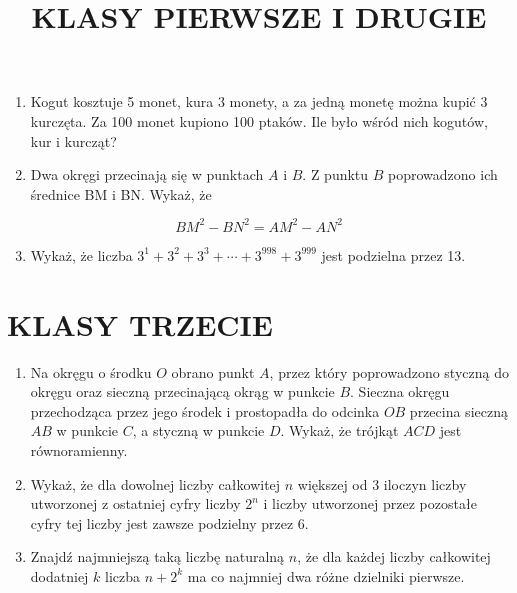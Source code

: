 \documentclass[10pt]{article}
\title{KLASY PIERWSZE I DRUGIE }
\author{}
\date{}
\begin{document}
\maketitle
\begin{enumerate}
  \item Kogut kosztuje 5 monet, kura 3 monety, a za jedną monetę można kupić 3 kurczęta. Za 100 monet kupiono 100 ptaków. Ile było wśród nich kogutów, kur i kurcząt?
  \item Dwa okręgi przecinają się w punktach \(A\) i \(B\). Z punktu \(B\) poprowadzono ich średnice BM i BN. Wykaż, że
\end{enumerate}

\[
B M^{2}-B N^{2}=A M^{2}-A N^{2}
\]

\begin{enumerate}
  \setcounter{enumi}{2}
  \item Wykaż, że liczba \(3^{1}+3^{2}+3^{3}+\cdots+3^{998}+3^{999}\) jest podzielna przez 13.
\end{enumerate}

\section*{KLASY TRZECIE}
\begin{enumerate}
  \item Na okręgu o środku \(O\) obrano punkt \(A\), przez który poprowadzono styczną do okręgu oraz sieczną przecinającą okrąg w punkcie \(B\). Sieczna okręgu przechodząca przez jego środek i prostopadła do odcinka \(O B\) przecina sieczną \(A B\) w punkcie \(C\), a styczną w punkcie \(D\). Wykaż, że trójkąt \(A C D\) jest równoramienny.
  \item Wykaż, że dla dowolnej liczby całkowitej \(n\) większej od 3 iloczyn liczby utworzonej z ostatniej cyfry liczby \(2^{n}\) i liczby utworzonej przez pozostałe cyfry tej liczby jest zawsze podzielny przez 6.
  \item Znajdź najmniejszą taką liczbę naturalną \(n\), że dla każdej liczby całkowitej dodatniej \(k\) liczba \(n+2^{k}\) ma co najmniej dwa różne dzielniki pierwsze.
\end{enumerate}
\end{document}
